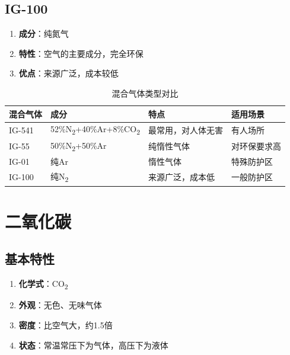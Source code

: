 \documentclass[12pt,UTF8]{ctexbook}
\begin{document}
\section{IG-100}

\begin{enumerate}
    \item \textbf{成分}：纯氮气
    \item \textbf{特性}：空气的主要成分，完全环保
    \item \textbf{优点}：来源广泛，成本较低
\end{enumerate}

\begin{table}[H]
    \centering
    \begin{tabular}{|p{2cm}|p{3cm}|p{4cm}|p{3cm}|}
        \hline
        \textbf{混合气体} & \textbf{成分} & \textbf{特点} & \textbf{适用场景} \\
        \hline
        IG-541 & 52\%N\textsubscript{2}+40\%Ar+8\%CO\textsubscript{2} & 最常用，对人体无害 & 有人场所 \\
        \hline
        IG-55 & 50\%N\textsubscript{2}+50\%Ar & 纯惰性气体 & 对环保要求高 \\
        \hline
        IG-01 & 纯Ar & 惰性气体 & 特殊防护区 \\
        \hline
        IG-100 & 纯N\textsubscript{2} & 来源广泛，成本低 & 一般防护区 \\
        \hline
    \end{tabular}
    \caption{混合气体类型对比}
    \label{tab:ig_gases}
\end{table}

\chapter{二氧化碳}

\section{基本特性}

\begin{enumerate}
    \item \textbf{化学式}：CO\textsubscript{2}
    \item \textbf{外观}：无色、无味气体
    \item \textbf{密度}：比空气大，约1.5倍
    \item \textbf{状态}：常温常压下为气体，高压下为液体
\end{enumerate}
\end{document}
